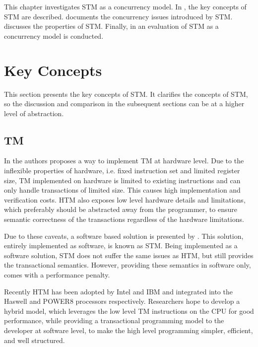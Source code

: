 \makeatletter {}\makeatother
{}
This chapter investigates \ac{STM} as a concurrency model. In , the key concepts of \ac{STM} are described.  documents the concurrency issues introduced by \ac{STM}.  discusses the properties of \ac{STM}. Finally, in  an evaluation of \ac{STM} as a concurrency model is conducted.
\label{chap:stm}

\section{Key Concepts}
\label{sec:stm_keyconcepts}
This section presents the key concepts of \ac{STM}. It clarifies the concepts of \ac{STM}, so the discussion and comparison in the subsequent sections can be at a higher level of abstraction.

\subsection{\acl{TM}}
\label{sec:tmevo}
In \cite{herlihy1993transactional} the authors proposes a way to implement \ac{TM} at hardware level. Due to the inflexible properties of hardware, i.e. fixed instruction set and limited register size, \ac{TM} implemented on hardware is limited to existing instructions and can only handle transactions of limited size\cite{dragojevic2011stm}. This causes high implementation and verification costs\cite{cascaval2008software}. \ac{HTM} also exposes low level hardware details and limitations\cite{herlihy2011tm}, which preferably should be abstracted away from the programmer, to ensure semantic correctness of the transactions regardless of the hardware limitations. 

Due to these caveats, a software based solution is presented by \cite{shavit1997software}. This solution, entirely implemented as software, is known as \acl{STM}. Being implemented as a software solution, \ac{STM} does not suffer the same issues as \ac{HTM}, but still provides the transactional semantics. However, providing these semantics in software only, comes with a performance penalty\cite{dragojevic2011stm}\cite{cascaval2008software}.

Recently \ac{HTM} has been adopted by Intel and IBM and integrated into the Haswell and POWER8 processors respectively\cite{Anthes:2014:RSP:2684442.2667109}. Researchers hope to develop a hybrid model, which leverages the low level \ac{TM} instructions on the \ac{CPU} for good performance, while providing a transactional programming model to the developer at software level, to make the high level programming simpler, efficient, and well structured\cite{Anthes:2014:RSP:2684442.2667109}.

